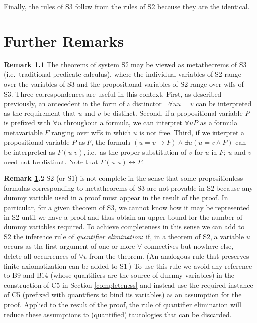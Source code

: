 \documentclass[leqno]{article}
\begin{document}
     Finally, the rules of S3 follow from the rules of S2 because they are
the identical.


\section{Further Remarks}\label{furtherRemarks}

     {\bf Remark \ref{furtherRemarks}.1} The theorems of system S2 may be viewed as metatheorems
of S3 (i.e.\ traditional predicate calculus), where the individual variables
of S2 range over the variables of S3 and the propositional variables of S2
range over wffs of S3.  Three correspondences are useful in this context.
First, as described previously, an antecedent in the form of a distinctor
$\lnot \forall uu=v$ can be interpreted as the requirement that $u$ and $v$
be distinct. Second, if a propositional variable $P$ is prefixed with
$\forall u$ throughout a formula, we can interpret $\forall uP$ as a formula
metavariable $F$ ranging over wffs in which $u$ is not free.  Third, if we
interpret a propositional variable $P$ as $F$, the formula $(u=v\rightarrow
P)\wedge \exists u(u=v\wedge P)$ can be interpreted as $F(u|v)$, i.e.\ as the
proper substitution of $v$ for $u$ in $F$; $u$ and $v$ need not be distinct.
Note that $F(u|u) \leftrightarrow F$.

     {\bf Remark \ref{furtherRemarks}.2} S2 (or S1) is not complete in the sense that some
propositionless formulas corresponding to metatheorems of S3 are not provable
in S2 because any dummy variable used in a proof must appear in the result of
the proof.  In particular, for a given theorem of S3, we cannot know how it may
be represented in S2 until we have a proof and thus obtain an upper bound for
the number of dummy variables required.  To achieve completeness in this sense
we can add to S2 the inference rule of {\em quantifier elimination}:  if, in a
theorem of S2, a variable $u$ occurs as the first argument of one or more
$\forall $ connectives but nowhere else, delete all occurrences of $\forall u$
from the theorem.  (An analogous rule that preserves finite axiomatization can
be added to S1.)  To use this rule we avoid any reference to B9 and B14 (whose
quantifiers are the source of dummy variables) in the construction of C5 in
Section \ref{completeness} and instead use the required instance of C5
(prefixed with quantifiers to bind its variables) as an assumption for the
proof.  Applied to the result of the proof, the rule of quantifier elimination
will reduce these assumptions to (quantified) tautologies that can be
discarded.
\end{document}
